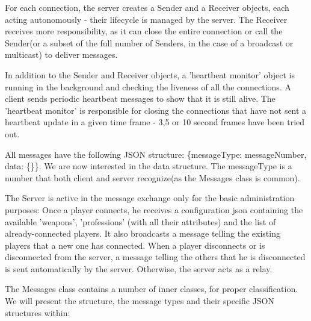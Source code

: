 For each connection, the server creates a Sender and a Receiver objects, each
acting autonomously - their lifecycle is managed by the server. The Receiver
receives more responsibility, as it can close the entire connection or call the
Sender(or a subset of the full number of Senders, in the case of a broadcast or
multicast) to deliver messages.\newline

In addition to the Sender and Receiver objects, a 'heartbeat monitor' object is
running in the background and checking the liveness of all the connections. A
client sends periodic heartbeat messages to show that it is still alive. The
'heartbeat monitor' is responsible for closing the connections that have not
sent a heartbeat update in a given time frame - 3,5 or 10 second frames have
been tried out.\newline

All messages have the following JSON structure: \{messageType: messageNumber,
data: \{\}\}. We are now interested in the data structure. The messageType is a
number that both client and server recognize(as the Messages class is
common).\newline

The Server is active in the message exchange only for the basic administration
purposes: Once a player connects, he receives a configuration json containing
the available 'weapons', 'professions' (with all their attributes) and the list
of already-connected players. It also broadcasts a message telling the existing
players that a new one has connected. When a player disconnects or is
disconnected from the server, a message telling the others that he is
disconnected is sent automatically by the server. Otherwise, the server acts as
a relay.\newline

The Messages class contains a number of inner classes, for proper
classification. We will present the structure, the message types and their
specific JSON structures within:

